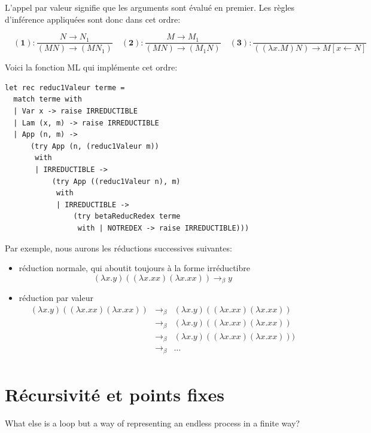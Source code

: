 L'appel par valeur signifie que les arguments sont évalué en premier. Les règles d'inférence appliquées sont donc dans cet ordre:

$$
\quad \mathbf{(1)} : \frac{N \rightarrow N_1}{(M N) \rightarrow (M N_1)}
\quad \mathbf{(2)} : \frac{M \rightarrow M_1}{(M N) \rightarrow (M_1 N)}
\quad \mathbf{(3)} : \frac{}{((\lambda x.M)N) \rightarrow M[x \leftarrow N]} 
$$

Voici la fonction ML qui implémente cet ordre:
\begin{Verbatim}
let rec reduc1Valeur terme =
  match terme with
  | Var x -> raise IRREDUCTIBLE
  | Lam (x, m) -> raise IRREDUCTIBLE
  | App (n, m) ->
      (try App (n, (reduc1Valeur m))
       with
       | IRREDUCTIBLE ->
           (try App ((reduc1Valeur n), m)
            with
            | IRREDUCTIBLE ->
                (try betaReducRedex terme
                 with | NOTREDEX -> raise IRREDUCTIBLE)))
\end{Verbatim}

Par exemple, nous aurons les réductions successives suivantes: 

\begin{itemize}
\item réduction normale, qui aboutit toujours à la forme irréductibre
$$ (\lambda x.y) ((\lambda x.xx) (\lambda x.xx)) \rightarrow_\beta y $$ 

\item réduction par valeur 
$$
\begin{array}{ccc}
 (\lambda x.y)((\lambda x.xx) (\lambda x.xx)) &  \rightarrow_\beta  & (\lambda x.y)((\lambda x.xx) (\lambda x.xx))\\ 
 & \rightarrow_\beta  & (\lambda x.y)((\lambda x.xx) (\lambda x.xx)) \\
 &\rightarrow_\beta  & (\lambda x.y)((\lambda x.xx) (\lambda x.xx))) \\
 & \rightarrow_\beta  & \ldots \\
\end{array}
$$
\end{itemize}

\section{Récursivité et points fixes} 

What else is a loop but a way of representing an endless process in a finite way?
\cite{god}


